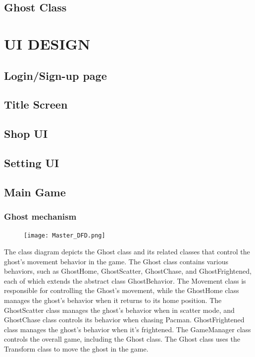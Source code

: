 \documentclass[11pt]{article}
\begin{document}
\subsection{Ghost Class}


\section{UI DESIGN}

\subsection{Login/Sign-up page}

\subsection{Title Screen}

\subsection{Shop UI}

\subsection{Setting UI}

\subsection{Main Game}

\subsubsection{Ghost mechanism}

\begin{figure}[H]
    \centering
    \texttt{[image: Master\_DFD.png]}
\end{figure}

The class diagram depicts the Ghost class and its related classes that control the ghost's movement behavior in the game. The Ghost class contains various behaviors, such as GhostHome, GhostScatter, GhostChase, and GhostFrightened, each of which extends the abstract class GhostBehavior. The Movement class is responsible for controlling the Ghost's movement, while the GhostHome class manages the ghost's behavior when it returns to its home position. The GhostScatter class manages the ghost's behavior when in scatter mode, and GhostChase class controls its behavior when chasing Pacman. GhostFrightened class manages the ghost's behavior when it's frightened. The GameManager class controls the overall game, including the Ghost class. The Ghost class uses the Transform class to move the ghost in the game.
\end{document}
